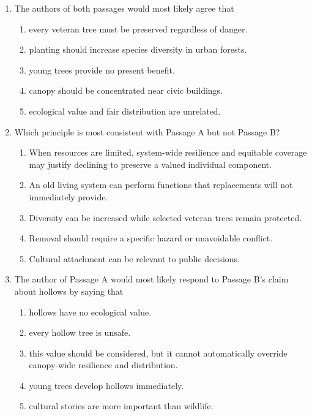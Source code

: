 \begin{enumerate}
\item The authors of both passages would most likely agree that
\begin{enumerate}
\item[(A)] every veteran tree must be preserved regardless of danger.
\item[(B)] planting should increase species diversity in urban forests.
\item[(C)] young trees provide no present benefit.
\item[(D)] canopy should be concentrated near civic buildings.
\item[(E)] ecological value and fair distribution are unrelated.
\end{enumerate}

\item Which principle is most consistent with Passage A but not Passage B?
\begin{enumerate}
\item[(A)] When resources are limited, system-wide resilience and equitable coverage may justify declining to preserve a valued individual component.
\item[(B)] An old living system can perform functions that replacements will not immediately provide.
\item[(C)] Diversity can be increased while selected veteran trees remain protected.
\item[(D)] Removal should require a specific hazard or unavoidable conflict.
\item[(E)] Cultural attachment can be relevant to public decisions.
\end{enumerate}

\item The author of Passage A would most likely respond to Passage B's claim about hollows by saying that
\begin{enumerate}
\item[(A)] hollows have no ecological value.
\item[(B)] every hollow tree is unsafe.
\item[(C)] this value should be considered, but it cannot automatically override canopy-wide resilience and distribution.
\item[(D)] young trees develop hollows immediately.
\item[(E)] cultural stories are more important than wildlife.
\end{enumerate}


\end{enumerate}
